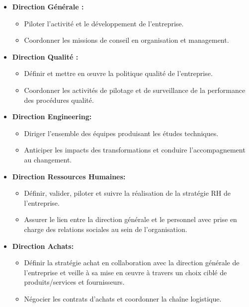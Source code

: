     \begin{itemize}
      
    \item [$-$]\textbf{Direction Générale :}
    
    \begin{itemize}[label=\textbullet]
    \item Piloter l'activité et le développement de l'entreprise.
    \item Coordonner les missions de conseil en organisation et management. 
    \end{itemize}

     \item [$-$]\textbf{Direction Qualité :}
   
    \begin{itemize}[label=\textbullet,]
    \item Définir et mettre en œuvre la politique qualité de l'entreprise.
    \item Coordonner les activités de pilotage et de surveillance de la performance des procédures qualité. 
    \end{itemize}

  
    \item [$-$] \textbf{Direction Engineering:}    
    \begin{itemize}[label=\textbullet,font=\normalsize]
    \item Diriger l’ensemble des équipes produisant les études techniques.
    \item Anticiper les impacts des transformations et conduire l’accompagnement au changement. 
    \end{itemize}

    
     \item [$-$]\textbf{Direction Ressources Humaines:}
    
    \begin{itemize}[label=\textbullet]
    \item Définir, valider, piloter et suivre la réalisation de la stratégie RH de l’entreprise.
    \item Assurer le lien entre la direction générale et le personnel avec prise en charge des relations sociales au sein de l'organisation.  
    \end{itemize}

     \item [$-$]\textbf{Direction Achats:}

    \begin{itemize}[label=\textbullet]
    \item Définir la stratégie achat en collaboration avec la direction générale de l'entreprise et veille à sa mise en œuvre à travers un choix ciblé de produits/services et fournisseurs.
    \item Négocier les contrats d'achats et coordonner la chaîne logistique.   
    \end{itemize}


\end{itemize}
